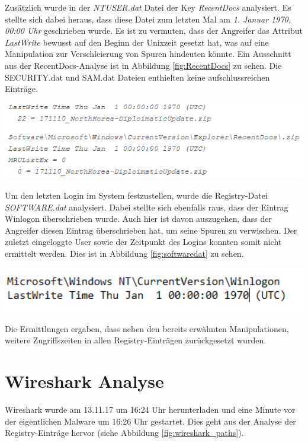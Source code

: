 Zusätzlich wurde in der \textit{NTUSER.dat} Datei der Key \textit{RecentDocs} analysiert. Es stellte sich dabei heraus, dass diese Datei zum letzten Mal am \textit{1. Januar 1970, 00:00 Uhr} geschrieben wurde.
Es ist zu vermuten, dass der Angreifer das Attribut \textit{LastWrite} bewusst auf den Beginn der Unixzeit gesetzt hat, was auf eine Manipulation zur Verschleierung von Spuren hindeuten könnte.
Ein Ausschnitt aus der RecentDocs-Analyse ist in Abbildung \ref{fig:RecentDocs} zu sehen.
Die SECURITY.dat und SAM.dat Dateien enthielten keine aufschlussreichen Einträge.

\begin{center}
	\includegraphics[width=15.8cm]{figures/prefetch_manipulation.png}
	\label{fig:RecentDocs}
\end{center}

\newpage
Um den letzten Login im System festzustellen, wurde die Registry-Datei \textit{SOFTWARE.dat} analysiert.
Dabei stellte sich ebenfalls raus, dass der Eintrag Winlogon überschrieben wurde.
Auch hier ist davon auszugehen, dass der Angreifer diesen Eintrag überschrieben hat, um seine Spuren zu verwischen.
Der zuletzt eingeloggte User sowie der Zeitpunkt des Logins konnten somit nicht ermittelt werden. Dies ist in Abbildung \ref{fig:softwaredat} zu sehen.

\begin{center}
	\includegraphics[width=15.8cm]{figures/softwaredat.png}
	\label{fig:softwaredat}
\end{center}

Die Ermittlungen ergaben, dass neben den bereits erwähnten Manipulationen, weitere Zugriffszeiten in allen Registry-Einträgen zurückgesetzt wurden.

\section{Wireshark Analyse}
Wireshark wurde am 13.11.17 um 16:24 Uhr herunterladen und eine Minute vor der eigentlichen Malware um 16:26 Uhr gestartet.
Dies geht aus der Analyse der Registry-Einträge hervor (siehe Abbildung \ref{fig:wireshark_paths}).

